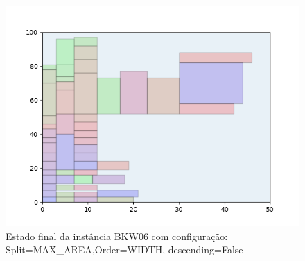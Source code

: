 \begin{figure}[H]
    \centering
    \caption[]{Estado final da instância BKW06 com configuração: Split=MAX_AREA,Order=WIDTH, descending=False}
    \label{fig:bkw06-max_area-width-false}
    \includegraphics[scale=0.5]{output/figures/bkw/bkw06/max_area/width/false/00}
\end{figure}